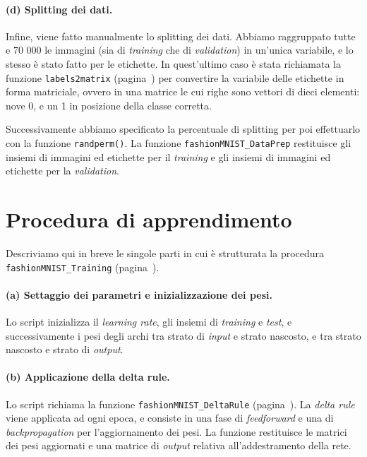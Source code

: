 \documentclass[a4paper,12pt]{article}
\begin{document}
\paragraph{(d) Splitting dei dati.}
Infine, viene fatto manualmente lo splitting dei dati. Abbiamo raggruppato tutte e 70 000 le immagini (sia di \emph{training} che di \emph{validation}) in un'unica variabile, e lo stesso è stato fatto per le etichette. In quest'ultimo caso è stata richiamata la funzione \texttt{labels2matrix} (pagina~\pageref{lst:label2matrix}) per convertire la variabile delle etichette in forma matriciale, ovvero in una matrice le cui righe sono vettori di dieci elementi: nove 0, e un 1 in posizione della classe corretta.

Successivamente abbiamo specificato la percentuale di splitting per poi effettuarlo con la funzione \texttt{randperm()}. La funzione \texttt{fashionMNIST\-\_\-Da\-ta\-Prep} restituisce gli insiemi di immagini ed etichette per il \emph{training} e gli insiemi di immagini ed etichette per la \emph{validation}.





\newpage
\section{Procedura di apprendimento} %
\label{sec:apprendimento}

Descriviamo qui in breve le singole parti in cui è strutturata la procedura \texttt{fashionMNIST\-\_\-Trai\-ning} (pagina~\pageref{lst:training}).

\paragraph{(a) Settaggio dei parametri e inizializzazione dei pesi.}
Lo script inizializza il \emph{learning rate}, gli insiemi di \emph{training} e \emph{test}, e successivamente i pesi degli archi tra strato di \emph{input} e strato nascosto, e tra strato nascosto e strato di \emph{output}.


\paragraph{(b) Applicazione della delta rule.}
Lo script richiama la funzione \texttt{fashionMNIST\-\_\-Del\-ta\-Rule} (pagina~\pageref{lst:deltarule}). La \emph{delta rule} viene applicata ad ogni epoca, e consiste in una fase di \emph{feedforward} e una di \emph{backpropagation} per l'aggiornamento dei pesi. La funzione restituisce le matrici dei pesi aggiornati e una matrice di \emph{output} relativa all'addestramento della rete.
\end{document}
